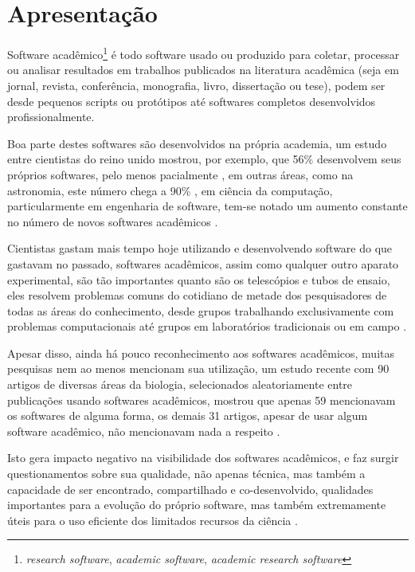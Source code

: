 
\section{Apresentação}

Software acadêmico\footnote{{\it research software}, {\it academic software},
{\it academic research software}} é todo software usado ou produzido para
coletar, processar ou analisar resultados em trabalhos publicados na literatura
acadêmica (seja em jornal, revista, conferência, monografia, livro, dissertação
ou tese), podem ser desde pequenos scripts ou protótipos até softwares
completos desenvolvidos profissionalmente.

Boa parte destes softwares são desenvolvidos na própria academia, um estudo
entre cientistas do reino unido mostrou, por exemplo, que 56\% desenvolvem seus
próprios softwares, pelo menos pacialmente \cite{hettrick_2014_14809}, em
outras áreas, como na astronomia, este número chega a 90\%
\cite{momcheva2015software}, em ciência da computação, particularmente em
engenharia de software, tem-se notado um aumento constante no número de novos
softwares acadêmicos \cite{allen2017engineering}.

Cientistas gastam mais tempo hoje utilizando e desenvolvendo software do que
gastavam no passado, softwares acadêmicos, assim como qualquer outro aparato
experimental, são tão importantes quanto são os telescópios e tubos de ensaio,
eles resolvem problemas comuns do cotidiano de metade dos pesquisadores de
todas as áreas do conhecimento, desde grupos trabalhando exclusivamente com
problemas computacionais até grupos em laboratórios tradicionais ou em campo
\cite{wilson2014best}.

Apesar disso, ainda há pouco reconhecimento aos softwares acadêmicos, muitas
pesquisas nem ao menos mencionam sua utilização, um estudo recente com 90
artigos de diversas áreas da biologia, selecionados aleatoriamente entre
publicações usando softwares acadêmicos, mostrou que apenas 59 mencionavam os
softwares de alguma forma, os demais 31 artigos, apesar de usar algum software
acadêmico, não mencionavam nada a respeito \cite{howison2016software}.

Isto gera impacto negativo na visibilidade dos softwares acadêmicos, e faz
surgir questionamentos sobre sua qualidade, não apenas técnica, mas também a
capacidade de ser encontrado, compartilhado e co-desenvolvido, qualidades
importantes para a evolução do próprio software, mas também extremamente úteis
para o uso eficiente dos limitados recursos da ciência \cite{howison2013,
katz2014transitive}.

